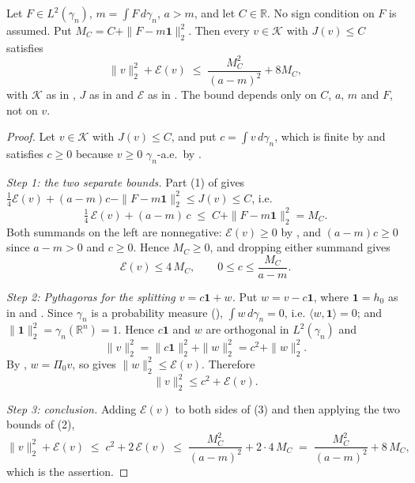 \begin{lemma}
Let $F \in L^2(\gamma_n)$, $m = \int F\, d\gamma_n$, $a > m$, and let
$C \in \mathbb{R}$.  No sign condition on $F$ is assumed.  Put
$M_C = C + \|F - m\mathbf{1}\|_2^2$.  Then every $v \in \mathcal{K}$ with
$J(v) \leq C$ satisfies
\[
  \|v\|_2^2 + \mathcal{E}(v)
    \;\leq\; \frac{M_C^2}{(a-m)^2} + 8 M_C ,
\]
with $\mathcal{K}$ as in , $J$ as in
 and $\mathcal{E}$ as in .  The bound
depends only on $C$, $a$, $m$ and $F$, not on $v$.
\end{lemma}
\begin{proof}
Let $v \in \mathcal{K}$ with $J(v) \leq C$, and put
$c = \int v\, d\gamma_n$, which is finite by  and satisfies
$c \geq 0$ because $v \geq 0$ $\gamma_n$-a.e.\ by .

\emph{Step 1: the two separate bounds.}
Part (1) of  gives
$\tfrac14\mathcal{E}(v) + (a-m)c - \|F-m\mathbf{1}\|_2^2 \leq J(v) \leq C$, i.e.
\begin{equation*}
  \tfrac14\,\mathcal{E}(v) + (a-m)\,c \;\leq\; C + \|F-m\mathbf{1}\|_2^2 = M_C .
  \tag{1}
\end{equation*}
Both summands on the left are nonnegative: $\mathcal{E}(v) \geq 0$ by
, and $(a-m)c \geq 0$ since $a - m > 0$ and $c \geq 0$.  Hence
$M_C \geq 0$, and dropping either summand gives
\begin{equation*}
  \mathcal{E}(v) \leq 4\,M_C ,
  \qquad
  0 \leq c \leq \frac{M_C}{a-m} . \tag{2}
\end{equation*}

\emph{Step 2: Pythagoras for the splitting $v = c\mathbf{1} + w$.}
Put $w = v - c\mathbf{1}$, where $\mathbf{1} = h_0$ as in  and
.  Since $\gamma_n$ is a probability measure
(), $\int w\, d\gamma_n = 0$, i.e.
$\langle w, \mathbf{1}\rangle = 0$; and $\|\mathbf{1}\|_2^2 = \gamma_n(\mathbb{R}^n) = 1$.
Hence $c\mathbf{1}$ and $w$ are orthogonal in $L^2(\gamma_n)$ and
\[
  \|v\|_2^2 = \|c\mathbf{1}\|_2^2 + \|w\|_2^2 = c^2 + \|w\|_2^2 .
\]
By , $w = \Pi_0 v$, so  gives
$\|w\|_2^2 \leq \mathcal{E}(v)$.  Therefore
\begin{equation*}
  \|v\|_2^2 \leq c^2 + \mathcal{E}(v) . \tag{3}
\end{equation*}

\emph{Step 3: conclusion.}
Adding $\mathcal{E}(v)$ to both sides of (3) and then applying the two bounds
of (2),
\[
  \|v\|_2^2 + \mathcal{E}(v)
    \;\leq\; c^2 + 2\,\mathcal{E}(v)
    \;\leq\; \frac{M_C^2}{(a-m)^2} + 2\cdot 4\,M_C
    \;=\; \frac{M_C^2}{(a-m)^2} + 8\,M_C ,
\]
which is the assertion.
\end{proof}
